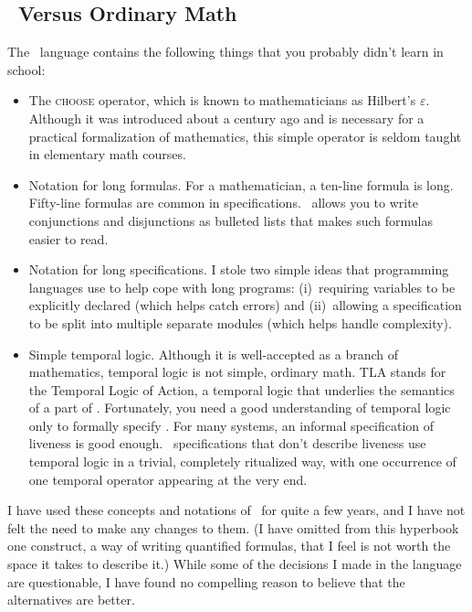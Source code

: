 \documentclass[fleqn,leqno]{article}
\begin{document}
\subsection*{\protect\tlaplus\ Versus Ordinary Math}
The \tlaplus\ 
language
contains the following things that you probably didn't learn in
school:
\begin{itemize}

\item The \textsc{choose} 
operator, which is known to mathematicians
as 
  \ctindex{1}{+8ed@\mmath{\icmd{varepsilon}}, Hilbert's}{+8ed}%
Hilbert's $\varepsilon$.  Although it was introduced about a century
ago and is necessary for a practical formalization of mathematics,
this simple operator is seldom taught in elementary math courses.

\item Notation for long formulas.  For a mathematician, a ten-line
formula is long.  Fifty-line formulas are common in specifications.
\tlaplus\ allows you to write conjunctions and
disjunctions as bulleted lists that makes such formulas easier to
read.

\item Notation for long specifications.  I stole two simple ideas that
programming languages use to help cope with long programs:
(i)~requiring variables to be explicitly declared (which helps catch
errors) and (ii)~allowing a specification to be split into multiple
separate modules (which helps handle complexity).

\item Simple temporal logic.  Although it is well-accepted as a branch
of mathematics, temporal logic is not simple, ordinary math.  
TLA
stands for the Temporal Logic of Action, a temporal logic that
underlies the semantics of a part of \tlaplus.  Fortunately, you need
a good understanding of temporal logic only to formally specify
 .  
For many systems, an informal specification of liveness is good
enough.  \tlaplus\ specifications that don't describe liveness use
temporal logic in a trivial, completely ritualized way, with one
occurrence of one temporal operator appearing at the very end.
\end{itemize}
I have used these concepts and notations of \tlaplus\ for quite a few
years, and I have not felt the need to make any changes to them.  (I
have omitted from this hyperbook one construct, a way of writing
quantified formulas, that I feel is not worth the space it takes to
describe it.)  While some of the decisions I made in the language are
questionable, I have found no compelling reason to believe that the
alternatives are better.
\end{document}
